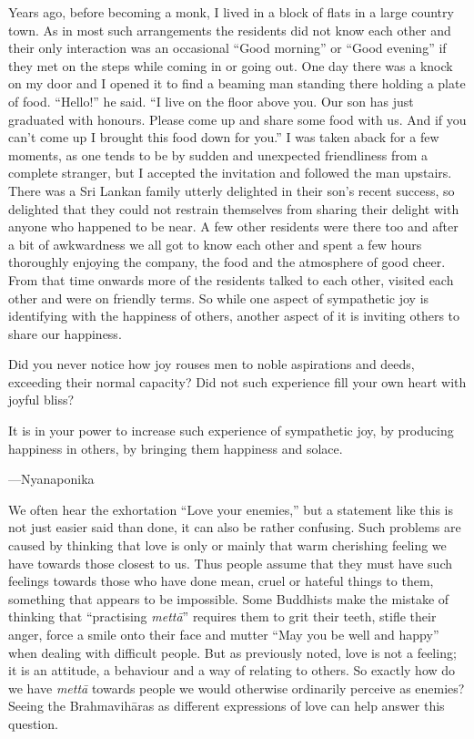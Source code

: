 \documentclass[10pt, openright]{book}
\newenvironment{epigram-2}%
{%
\setstretch{1.4}
\vspace{1em}
\noindent
\quoting[leftmargin=2cm,rightmargin=2cm]%
\begin{itshape}
\large
}%
{\end{itshape}\endquoting
}%
\newenvironment{epigram-2-followOn}%
{%
\setstretch{1.4}
\vspace{-1em}
\noindent
\quoting[leftmargin=2cm,rightmargin=2cm]%
\begin{itshape}
\large
}%
{\end{itshape}\endquoting
}%
\newenvironment{epigram-2-cite}%
{%
\quoting[leftmargin=2cm,rightmargin=2cm]%
\noindent\normal\hspace*{\fill} 
}%
{\endquoting
}%
\begin{document}
Years ago, before becoming a monk, I lived in a block of flats in a large country town. As in most such arrangements the residents did not know each other and their only interaction was an occasional “Good morning” or “Good evening” if they met on the steps while coming in or going out. One day there was a knock on my door and I opened it to find a beaming man standing there holding a plate of food. “Hello!” he said. “I live on the floor above you. Our son has just graduated with honours. Please come up and share some food with us. And if you can’t come up I brought this food down for you.” I was taken aback for a few moments, as one tends to be by sudden and unexpected friendliness from a complete stranger, but I accepted the invitation and followed the man upstairs. There was a Sri Lankan family utterly delighted in their son’s recent success, so delighted that they could not restrain themselves from sharing their delight with anyone who happened to be near. A few other residents were there too and after a bit of awkwardness we all got to know each other and spent a few hours thoroughly enjoying the company, the food and the atmosphere of good cheer. From that time onwards more of the residents talked to each other, visited each other and were on friendly terms. So while one aspect of sympathetic joy is identifying with the happiness of others, another aspect of it is inviting others to share our happiness.


\begin{epigram-2}
Did you never notice how joy rouses men to noble aspirations and deeds, exceeding their normal capacity? Did not such experience fill your own heart with joyful bliss?
\end{epigram-2}
\begin{epigram-2-followOn}
It is in your power to increase such experience of sympathetic joy, by producing happiness in others, by bringing them happiness and solace.
\end{epigram-2-followOn}
\begin{epigram-2-cite}
—Nyanaponika
\end{epigram-2-cite}

We often hear the exhortation “Love your enemies,” but a statement like this is not just easier said than done, it can also be rather confusing. Such problems are caused by thinking that love is only or mainly that warm cherishing feeling we have towards those closest to us. Thus people assume that they must have such feelings towards those who have done mean, cruel or hateful things to them, something that appears to be impossible. Some Buddhists make the mistake of thinking that “practising \textit{mettā}” requires them to grit their teeth, stifle their anger, force a smile onto their face and mutter “May you be well and happy” when dealing with difficult people. But as previously noted, love is not a feeling; it is an attitude, a behaviour and a way of relating to others. So exactly how do we have \textit{mettā} towards people we would otherwise ordinarily perceive as enemies? Seeing the Brahmavihāras as different expressions of love can help answer this question.
\end{document}
